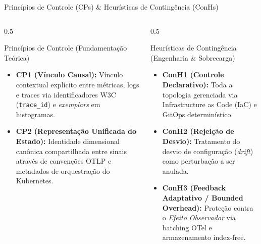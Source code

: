 \documentclass[aspectratio=169, 10pt]{beamer}
\begin{document}
\begin{frame}{Princípios de Controle (CPs) \& Heurísticas de Contingência (ConHs)}
  \begin{columns}[T]
    \begin{column}{0.5\textwidth}
      \begin{exampleblock}{Princípios de Controle (Fundamentação Teórica)}
        \begin{itemize}
          \item \textbf{CP1 (Vínculo Causal):} Vínculo contextual explícito entre métricas, logs e traces via identificadores W3C (\texttt{trace\_id}) e \textit{exemplars} em histogramas.
          \item \textbf{CP2 (Representação Unificada do Estado):} Identidade dimensional canônica compartilhada entre sinais através de convenções OTLP e metadados de orquestração do Kubernetes.
        \end{itemize}
      \end{exampleblock}
    \end{column}
    
    \begin{column}{0.5\textwidth}
      \begin{alertblock}{Heurísticas de Contingência (Engenharia \& Sobrecarga)}
        \begin{itemize}
          \item \textbf{ConH1 (Controle Declarativo):} Toda a topologia gerenciada via Infrastructure as Code (IaC) e GitOps determinístico.
          \item \textbf{ConH2 (Rejeição de Desvio):} Tratamento do desvio de configuração (\textit{drift}) como perturbação a ser anulada.
          \item \textbf{ConH3 (Feedback Adaptativo / Bounded Overhead):} Proteção contra o \textit{Efeito Observador} via batching OTel e armazenamento index-free.
        \end{itemize}
      \end{alertblock}
    \end{column}
  \end{columns}
\end{frame}
\end{document}
